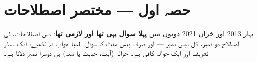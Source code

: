 %

\section*{حصہ اول --- مختصر اصطلاحات}

\noindent
بہار \textenglish{2013} اور خزاں \textenglish{2021} دونوں میں \textbf{پہلا
سوال یہی تھا اور لازمی تھا}: دس اصطلاحات، فی اصطلاح دو نمبر، کل بیس نمبر ---
اور صرف بیس منٹ کا سوال۔ لمبا جواب نہ لکھیے؛ ایک سطر تعریف اور ایک حوالہ کافی
ہے۔ حوالہ (آیت، حدیث یا سنہ) ہی دوسرا نمبر دلاتا ہے۔

